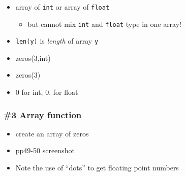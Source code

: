 \documentclass[14pt]{beamer}
\newcommand\red[1]{{\color{red} #1}}
\begin{document}

\begin{frame}[fragile]

\frametitle{}

\begin{itemize}
	\item array of \texttt{int} or array of \texttt{float}
	\begin{itemize}
		\item but cannot mix \texttt{int} and \texttt{float} type in one array!
	\end{itemize}
	\item \texttt{len(y)} is \red{\emph{length}} of array \texttt{y}
	\item zeros(3,int)
	\item zeros(3)
	\item 0 for int, 0. for float
\end{itemize}

\end{frame}


\begin{frame}[fragile]

\frametitle{\#3 Array function}

\begin{itemize}
	\item create an array of zeros
	\item pp49-50 screenshot
	\item Note the use of ``dots'' to get floating point numbers
\end{itemize}

\end{frame}



\end{document}
